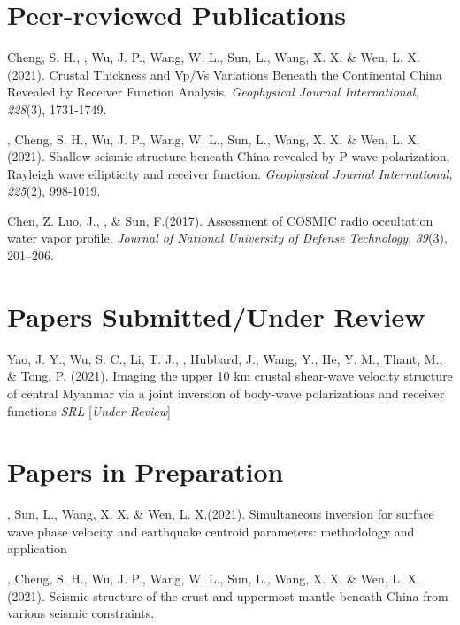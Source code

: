 \newcommand{\Revision}{\textit{under revision}}
\newcommand{\CS}{*} %
\newcommand{\CF}{\textsuperscript{\#}} %


\section*{Peer-reviewed Publications}

\begin{etaremune}
\item
    Cheng, S. H., \Xiao, Wu, J. P., Wang, W. L., Sun, L., Wang, X. X. \& Wen, L. X.(2021).
    Crustal Thickness and Vp/Vs Variations Beneath the Continental China Revealed by Receiver Function Analysis.
    \textit{Geophysical Journal International}, \textit{228}(3), 1731-1749.  
\item
    \Xiao, Cheng, S. H., Wu, J. P., Wang, W. L., Sun, L., Wang, X. X. \& Wen, L. X.(2021).
    Shallow seismic structure beneath China revealed by P wave polarization, Rayleigh wave ellipticity and receiver function.
    \textit{Geophysical Journal International}, \textit{225}(2), 998-1019. 
\item
    Chen, Z. Luo, J.,  \Xiao, \& Sun, F.(2017).
    Assessment of COSMIC radio occultation water vapor profile.
    \textit{Journal of National University of Defense Technology}, \textit{39}(3), 201--206.
\end{etaremune}

\section*{Papers Submitted/Under Review}
\begin{etaremune}
\item
    Yao, J. Y., Wu, S. C., Li, T. J., \Xiao, Hubbard, J., Wang, Y., He, Y. M., Thant, M., \& Tong, P. (2021).
    Imaging the upper 10 km crustal shear-wave velocity structure of central Myanmar via a joint inversion of body-wave polarizations and receiver functions
    \textit{SRL} [\textit{Under Review}]
\end{etaremune}

\section*{Papers in Preparation}
\begin{etaremune}
\item
    \Xiao, Sun, L., Wang, X. X. \& Wen, L. X.(2021).
    Simultaneous inversion for surface wave phase velocity and earthquake centroid parameters: methodology and application
\item
    \Xiao, Cheng, S. H., Wu, J. P., Wang, W. L., Sun, L., Wang, X. X. \& Wen, L. X.(2021).
    Seismic structure of the crust and uppermost mantle beneath China from various seismic constraints.
\end{etaremune}

